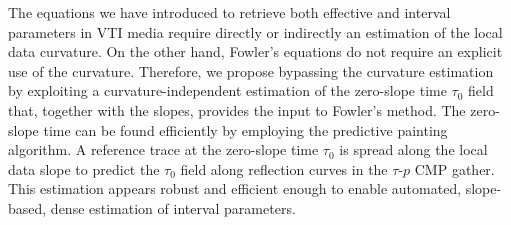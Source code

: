 The equations we have introduced to retrieve both effective and
interval parameters in VTI media require directly or indirectly an
estimation of the local data curvature.
On the other hand, Fowler's equations do not require an explicit use
of the curvature. Therefore, we propose bypassing the curvature
estimation by exploiting a curvature-independent estimation of the
zero-slope time $\tau_{0}$ field that, together with the slopes,
provides the input to Fowler's method. The zero-slope time can be
found efficiently by employing the predictive painting algorithm.  A
reference trace at the zero-slope time $\tau _{0}$ is spread along the
local data slope to predict the $\tau_0$ field along reflection curves
in the $\tau$-$p$ CMP gather. This estimation appears robust and
efficient enough to enable automated, slope-based, dense estimation of
interval parameters.

\begin{comment}
This processing can be straightforwardly extended to pure S-waves data
using the dispersion relations introduced by \cite{stovas:2506}.
Moreover, we believe that our \taup slope-based processing can be
applied to 3D data as an alternative to \cite{burnett:WB129} and
\cite{wang:WB117} approaches.  We have demonstrated the practical
applicability of our method for interval VTI velocity estimations, on
both synthetic and field-data examples.
\end{comment}


